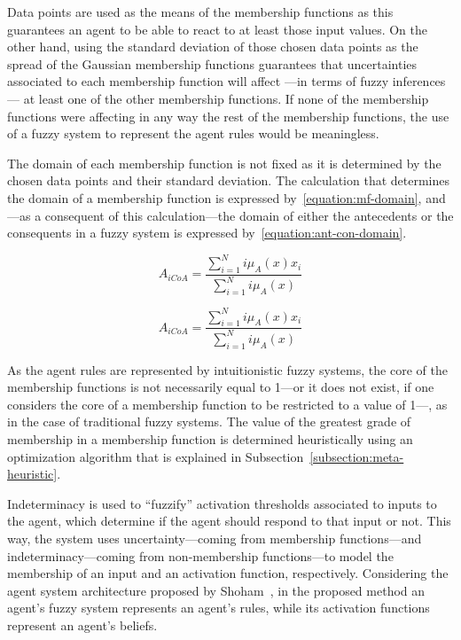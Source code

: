 \documentclass{ieeeaccess}
\begin{document}
Data points are used as the means of the membership functions as this guarantees
an agent to be able to react to at least those input values. On the other hand,
using the standard deviation of those chosen data points as the spread of the
Gaussian membership functions guarantees that uncertainties associated to each
membership function will affect ---in terms of fuzzy inferences--- at least one of
the other membership functions. If none of the membership functions were
affecting in any way the rest of the membership functions, the use of a fuzzy
system to represent the agent rules would be meaningless.

The domain of each membership function is not fixed as it is determined by the
chosen data points and their standard deviation. The calculation that determines
the domain of a membership function is expressed by~\ref{equation:mf-domain}, and---as a consequent of this
calculation---the domain of either the antecedents or the consequents in a fuzzy
system is expressed by~\ref{equation:ant-con-domain}. %


\begin{equation}
  \label{equation:mf-domain}
  A_{iCoA} = \dfrac{\sum_{i=1}^{N} i\mu_{A}(x) x_{i}}{\sum_{i=1}^{N}
    i\mu_{A}(x)}
\end{equation}

\begin{equation}
  \label{equation:ant-con-domain}
  A_{iCoA} = \dfrac{\sum_{i=1}^{N} i\mu_{A}(x) x_{i}}{\sum_{i=1}^{N}
    i\mu_{A}(x)}
\end{equation}

As the agent rules are represented by intuitionistic fuzzy systems, the core of
the membership functions is not necessarily equal to 1---or it does not exist,
if one considers the core of a membership function to be restricted to a value
of 1---, as in the case of traditional fuzzy systems. The value of the greatest
grade of membership in a membership function is determined heuristically using
an optimization algorithm that is explained in
Subsection~\ref{subsection:meta-heuristic}.

Indeterminacy is used to ``fuzzify'' activation thresholds associated to inputs
to the agent, which determine if the agent should respond to that input or
not. This way, the system uses uncertainty---coming from membership
functions---and indeterminacy---coming from non-membership functions---to model
the membership of an input and an activation function,
respectively. Considering the agent system architecture proposed by
Shoham~\cite{Shoham1993}, in the proposed method an agent's fuzzy system
represents an agent's rules, while its activation functions represent an
agent's beliefs.
\end{document}
